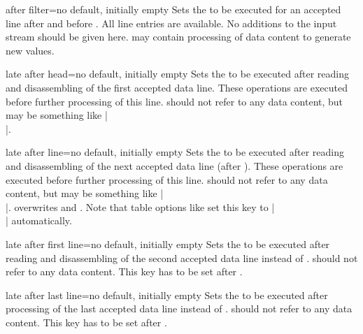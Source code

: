 \documentclass[a4paper,11pt]{ltxdoc}
\begin{document}
\begin{docCsvKey}[][doc new=2021-07-06]{after filter}{=}{no default, initially empty}
  Sets the  to be executed for an accepted line after
   and before .
  All line entries are available.
  No additions to the input stream should be given here.  may
  contain processing of data content to generate new values.
\end{docCsvKey}

\begin{docCsvKey}{late after head}{=}{no default, initially empty}
  Sets the  to be executed after reading and disassembling
  of the first accepted data line.
  These operations are executed before further processing of this line.
   should not refer to any data content, but may be something
  like |\\|.
\end{docCsvKey}

\begin{docCsvKey}{late after line}{=}{no default, initially empty}
  Sets the  to be executed after reading and disassembling
  of the next accepted data line (after ).
  These operations are executed before further processing of this line.
   should not refer to any data content, but may be something
  like |\\|.
   overwrites
   and
  .
  Note that table options like  set this key to |\\|
  automatically.
\end{docCsvKey}


\begin{docCsvKey}{late after first line}{=}{no default, initially empty}
  Sets the  to be executed after reading and disassembling
  of the second accepted data line instead of .
   should not refer to any data content.
  This key has to be set after .
\end{docCsvKey}


\begin{docCsvKey}{late after last line}{=}{no default, initially empty}
  Sets the  to be executed after processing of the last
  accepted data line instead of .
   should not refer to any data content.
  This key has to be set after .
\end{docCsvKey}
\end{document}
